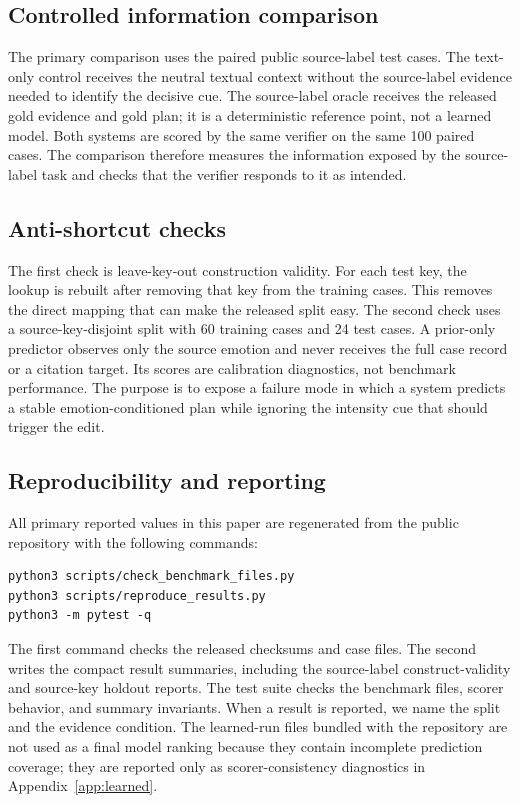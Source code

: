 \documentclass{article}
\begin{document}
\subsection{Controlled information comparison}

The primary comparison uses the paired public source-label test cases. The text-only control receives the neutral textual context without the source-label evidence needed to identify the decisive cue. The source-label oracle receives the released gold evidence and gold plan; it is a deterministic reference point, not a learned model. Both systems are scored by the same verifier on the same 100 paired cases. The comparison therefore measures the information exposed by the source-label task and checks that the verifier responds to it as intended.

\subsection{Anti-shortcut checks}

The first check is leave-key-out construction validity. For each test key, the lookup is rebuilt after removing that key from the training cases. This removes the direct mapping that can make the released split easy. The second check uses a source-key-disjoint split with 60 training cases and 24 test cases. A prior-only predictor observes only the source emotion and never receives the full case record or a citation target. Its scores are calibration diagnostics, not benchmark performance. The purpose is to expose a failure mode in which a system predicts a stable emotion-conditioned plan while ignoring the intensity cue that should trigger the edit.

\subsection{Reproducibility and reporting}

All primary reported values in this paper are regenerated from the public repository with the following commands:

\begin{verbatim}
python3 scripts/check_benchmark_files.py
python3 scripts/reproduce_results.py
python3 -m pytest -q
\end{verbatim}

The first command checks the released checksums and case files. The second writes the compact result summaries, including the source-label construct-validity and source-key holdout reports. The test suite checks the benchmark files, scorer behavior, and summary invariants. When a result is reported, we name the split and the evidence condition. The learned-run files bundled with the repository are not used as a final model ranking because they contain incomplete prediction coverage; they are reported only as scorer-consistency diagnostics in Appendix~\ref{app:learned}.
\end{document}
